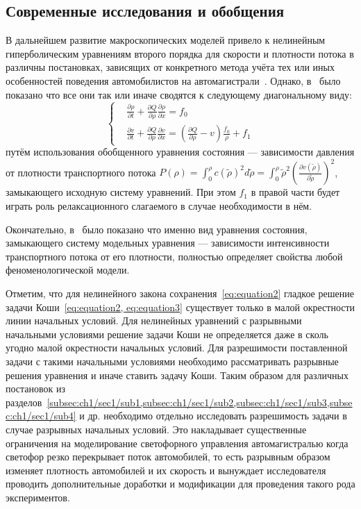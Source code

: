 \subsection{Современные исследования и обобщения}\label{subsec:ch1/sec1/sub5}
В дальнейшем развитие макроскопических моделей привело к нелинейным гиперболическим уравнениям второго порядка для скорости и плотности потока в различны постановках, зависящих от конкретного метода учёта тех или иных особенностей поведения автомобилистов на автомагистрали~\cite{payne1971model,daganzo1995requiem,papageorgiou1998some,zhang2002non,zhang2003anisotropic,siebel2006fundamental}.
Однако, в~\cite{collectiveArticle} было показано что все они так или иначе сводятся к следующему диагональному виду:
\[
\left\{
\begin{array}{rl}
  &\frac{\partial\rho}{\partial t} + \frac{\partial Q}{\partial\rho}\frac{\partial\rho}{\partial x} = f_0 \\
  &\frac{\partial v}{\partial t} + \frac{\partial Q}{\partial\rho}\frac{\partial v}{\partial x} = (\frac{\partial Q}{\partial\rho} - v) \frac{f_0}{\rho} + f_1
\end{array}
\right.
\]
путём использования обобщенного уравнения состояния --- зависимости давления от плотности транспортного потока \(P(\rho) = \int_{0}^{\rho} c(\tilde{\rho})^2 d\tilde{\rho} = \int_{0}^{\rho} \tilde{\rho}^2 (\frac{\partial v(\tilde{\rho})}{\partial \tilde{\rho}})^2\),
замыкающего исходную систему уравнений.
При этом \(f_1\) в правой части будет играть роль релаксационного слагаемого в случае необходимости в нём.

Окончательно, в~\cite{collectiveArticle} было показано что именно вид уравнения состояния, замыкающего систему модельных уравнения --- зависимости интенсивности транспортного потока от его плотности, полностью определяет свойства любой феноменологической модели.

Отметим, что для нелинейного закона сохранения~\ref{eq:equation2} гладкое решение задачи Коши~\ref{eq:equation2, eq:equation3} существует только в малой окрестности линии начальных условий. Для нелинейных уравнений с разрывными начальными условиями решение задачи Коши не определяется даже в сколь угодно малой окрестности начальных условий.
Для разрешимости поставленной задачи с такими начальными условиями необходимо рассматривать разрывные решения уравнения и иначе ставить задачу Коши.
Таким образом для различных постановок из разделов~\ref{subsec:ch1/sec1/sub1,subsec:ch1/sec1/sub2,subsec:ch1/sec1/sub3,subsec:ch1/sec1/sub4} и др. необходимо отдельно исследовать разрешимость задачи в случае разрывных начальных условий.
Это накладывает существенные ограничения на моделирование светофорного управления автомагистралью когда светофор резко перекрывает поток автомобилей, то есть разрывным образом изменяет плотность автомобилей и их скорость и вынуждает исследователя проводить дополнительные доработки и модификации для проведения такого рода экспериментов.

